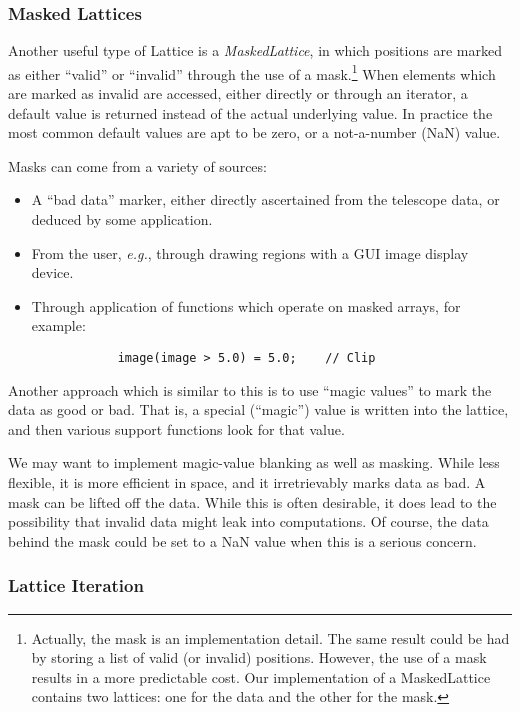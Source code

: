 \subsubsection{Masked Lattices}

Another useful type of Lattice is a {\em MaskedLattice}, in which
positions are marked as either ``valid'' or ``invalid'' through the
use of a mask.\footnote{Actually, the mask is an implementation
detail. The same result could be had by storing a list of valid (or
invalid) positions. However, the use of a mask results in a more
predictable cost. Our implementation of a MaskedLattice contains two
lattices: one for the data and the other for the mask.}  When elements
which are marked as invalid are accessed, either directly or through
an iterator, a default value is returned instead of the actual
underlying value. In practice the most common default values are apt
to be zero, or a not-a-number (NaN) value.

Masks can come from a variety of sources:
\begin{itemize}
	\item A ``bad data'' marker, either directly ascertained from
	the telescope data, or deduced by some application.
	\item From the user, {\em e.g.}, through drawing regions with
	a GUI image display device.
	\item Through application of functions which operate on masked
	arrays, for example:
		\begin{verbatim}
			image(image > 5.0) = 5.0;    // Clip
		\end{verbatim}
\end{itemize}

Another approach which is similar to this is to use ``magic values''
to mark the data as good or bad. That is, a special (``magic'') value
is written into the lattice, and then various support functions look
for that value. 

We may want to implement magic-value blanking as well as
masking. While less flexible, it is more efficient in space, and it
irretrievably marks data as bad. A mask can be lifted off the
data. While this is often desirable, it does lead to the possibility
that invalid data might leak into computations. Of course, the data
behind the mask could be set to a NaN value when this is a serious
concern.

\subsubsection{Lattice Iteration}

